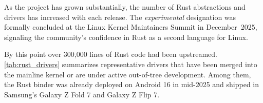 As the project has grown substantially, the number of Rust abstractions and drivers has increased with each release. The \emph{experimental} designation was formally concluded at the Linux Kernel Maintainers Summit in December~2025, signaling the community's confidence in Rust as a second language for Linux.

By this point over 300,000 lines of Rust code had been upstreamed. \autoref{tab:rust_drivers} summarizes representative drivers that have been merged into the mainline kernel or are under active
out-of-tree development. Among them, the Rust binder was already deployed on Android 16 in mid-2025 and shipped in Samsung’s Galaxy Z Fold 7 and Galaxy Z Flip 7.





